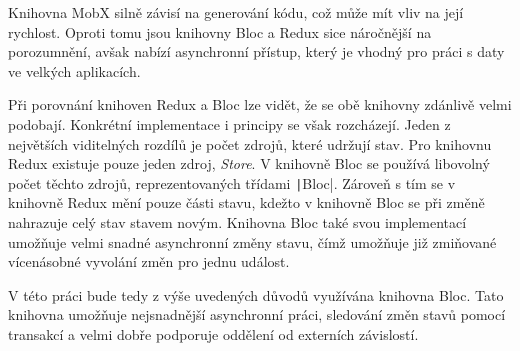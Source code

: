 Knihovna MobX silně závisí na generování kódu,
což může mít vliv na její rychlost.
Oproti tomu jsou knihovny Bloc a Redux sice náročnější na porozumnění,
avšak nabízí asynchronní přístup,
který je vhodný pro práci s daty ve velkých aplikacích.

Při porovnání knihoven Redux a Bloc lze vidět,
že se obě knihovny zdánlivě velmi podobají.
Konkrétní implementace i principy se však rozcházejí.
Jeden z největších viditelných rozdílů je počet zdrojů,
které udržují stav.
Pro knihovnu Redux existuje pouze jeden zdroj, \emph{Store}.
V knihovně Bloc se používá libovolný počet těchto zdrojů,
reprezentovaných třídami \texttt|Bloc|.
Zároveň s tím se v knihovně Redux mění pouze části stavu,
kdežto v knihovně Bloc se při změně nahrazuje celý stav stavem novým.
Knihovna Bloc také svou implementací umožňuje velmi snadné asynchronní změny
stavu,
čímž umožňuje již zmiňované vícenásobné vyvolání změn pro jednu událost.

V této práci bude tedy z výše uvedených důvodů využívána knihovna Bloc.
Tato knihovna umožňuje nejsnadnější asynchronní práci,
sledování změn stavů pomocí transakcí
a velmi dobře podporuje oddělení od externích závislostí.
